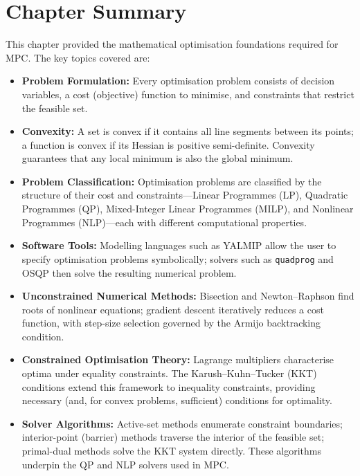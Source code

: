\section{Chapter Summary}

This chapter provided the mathematical optimisation foundations required for MPC. The key topics covered are:

\begin{itemize}
	\item \textbf{Problem Formulation:} Every optimisation problem consists of decision variables, a cost (objective) function to minimise, and constraints that restrict the feasible set.

	\item \textbf{Convexity:} A set is convex if it contains all line segments between its points; a function is convex if its Hessian is positive semi-definite. Convexity guarantees that any local minimum is also the global minimum.

	\item \textbf{Problem Classification:} Optimisation problems are classified by the structure of their cost and constraints---Linear Programmes (LP), Quadratic Programmes (QP), Mixed-Integer Linear Programmes (MILP), and Nonlinear Programmes (NLP)---each with different computational properties.

	\item \textbf{Software Tools:} Modelling languages such as YALMIP allow the user to specify optimisation problems symbolically; solvers such as \texttt{quadprog} and OSQP then solve the resulting numerical problem.

	\item \textbf{Unconstrained Numerical Methods:} Bisection and Newton--Raphson find roots of nonlinear equations; gradient descent iteratively reduces a cost function, with step-size selection governed by the Armijo backtracking condition.

	\item \textbf{Constrained Optimisation Theory:} Lagrange multipliers characterise optima under equality constraints. The Karush--Kuhn--Tucker (KKT) conditions extend this framework to inequality constraints, providing necessary (and, for convex problems, sufficient) conditions for optimality.

	\item \textbf{Solver Algorithms:} Active-set methods enumerate constraint boundaries; interior-point (barrier) methods traverse the interior of the feasible set; primal-dual methods solve the KKT system directly. These algorithms underpin the QP and NLP solvers used in MPC.
\end{itemize}

